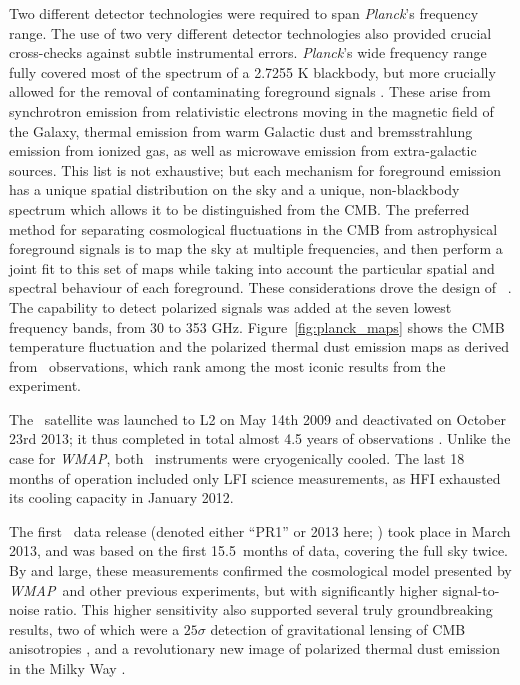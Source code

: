\documentclass[twocolumn]{aa}
\def\WMAP{\emph{WMAP}}
\begin{document}
Two different detector technologies were required to span
\emph{Planck}'s frequency range.  The use of two very different
detector technologies also provided crucial cross-checks against
subtle instrumental errors. \emph{Planck}'s wide frequency range fully
covered most of the spectrum of a 2.7255 K blackbody, but more
crucially allowed for the removal of contaminating foreground signals
\citep[e.g.,][]{leach2008}.  These arise from synchrotron emission
from relativistic electrons moving in the magnetic field of the
Galaxy, thermal emission from warm Galactic dust and bremsstrahlung
emission from ionized gas, as well as microwave emission from
extra-galactic sources.  This list is not exhaustive; but each
mechanism for foreground emission has a unique spatial distribution on
the sky and a unique, non-blackbody spectrum which allows it to be
distinguished from the CMB.  The preferred method for separating
cosmological fluctuations in the CMB from astrophysical foreground
signals is to map the sky at multiple frequencies, and then perform a
joint fit to this set of maps while taking into account the particular
spatial and spectral behaviour of each foreground.  These
considerations drove the design of
\Planck\ \citep{planck2005-bluebook}.  The capability to detect
polarized signals was added at the seven lowest frequency bands, from
30 to 353 GHz. Figure~\ref{fig:planck_maps} shows the CMB temperature
fluctuation and the polarized thermal dust emission maps as derived
from \Planck\ observations, which rank among the most iconic results
from the experiment.

The \Planck\ satellite was launched to L2 on May 14th 2009 and
deactivated on October 23rd 2013; it thus completed in total almost
4.5 years of observations \citep{planck2016-l01}. Unlike the case for
\WMAP, both \Planck\ instruments were cryogenically cooled. The last
18 months of operation included only LFI science measurements, as HFI
exhausted its cooling capacity in January 2012.

The first \Planck\ data release (denoted either ``PR1'' or 2013 here;
\citealp{planck2013-p01}) took place in March 2013, and was based on
the first 15.5~months of data, covering the full sky twice. By and
large, these measurements confirmed the cosmological model presented
by \WMAP\ and other previous experiments, but with significantly
higher signal-to-noise ratio. This higher sensitivity also supported
several truly groundbreaking results, two of which were a $25\sigma$
detection of gravitational lensing of CMB anisotropies
\citep{planck2013-p12}, and a revolutionary new image of polarized
thermal dust emission in the Milky Way \citep{planck2013-p06b}.
\end{document}
